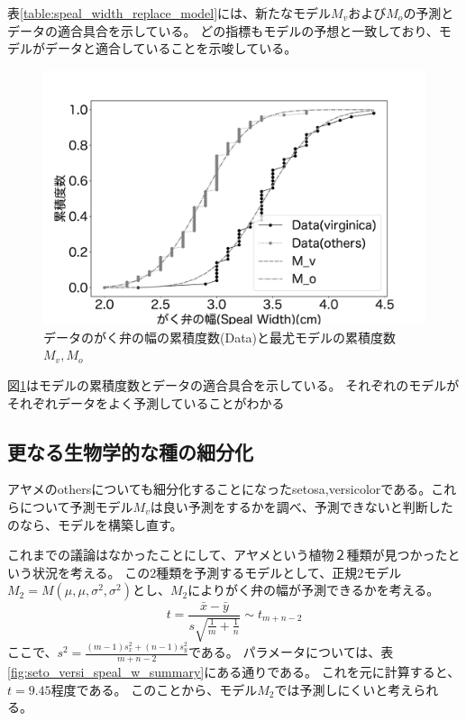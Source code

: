 表\ref{table:speal_width_replace_model}には、新たなモデル$M_v$および$M_o$の予測とデータの適合具合を示している。
どの指標もモデルの予想と一致しており、モデルがデータと適合していることを示唆している。

\begin{figure}
    \begin{center}
        \includegraphics[width=15cm]{./image/15_/speal_width_viri_model.pdf}
        \caption{データのがく弁の幅の累積度数(Data)と最尤モデルの累積度数$M_v,M_o$}
        \label{fig:speal_width_viri_model}
    \end{center}
\end{figure}

図\ref{fig:speal_width_viri_model}はモデルの累積度数とデータの適合具合を示している。
それぞれのモデルがそれぞれデータをよく予測していることがわかる

\subsection{更なる生物学的な種の細分化}
アヤメのothersについても細分化することになったsetosa,versicolorである。これらについて予測モデル$M_v$は良い予測をするかを調べ、予測できないと判断したのなら、モデルを構築し直す。

これまでの議論はなかったことにして、アヤメという植物２種類が見つかったという状況を考える。
この$2$種類を予測するモデルとして、正規2モデル$M_2=M(\mu,\mu,\sigma^2,\sigma^2)$とし、$M_2$によりがく弁の幅が予測できるかを考える。
\begin{equation*}
    t = \frac{\bar{x}-\bar{y}}{s\sqrt{\frac{1}{m} + \frac{1}{n} }} \sim t_{m+n-2}
\end{equation*}
ここで、$s^2=\frac{(m-1)s_x^2+(n-1)s_y^2}{m+n-2}$である。
パラメータについては、表\ref{fig:seto_versi_speal_w_summary}にある通りである。
これを元に計算すると、$t=9.45$程度である。
このことから、モデル$M_2$では予測しにくいと考えられる。

